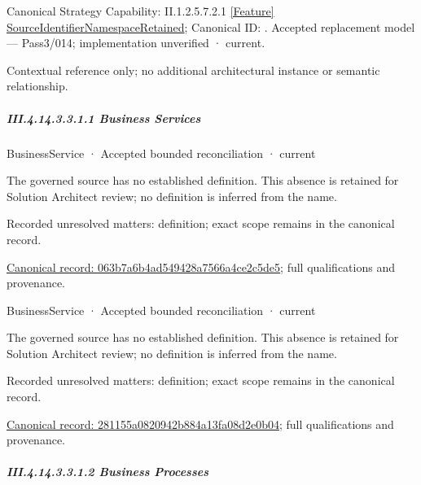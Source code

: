 {\small Canonical Strategy Capability: II.1.2.5.7.2.1 \hyperref[element:6c77e4aa99d6438c93a5df4720758414]{[Feature] SourceIdentifierNamespaceRetained}; Canonical ID: \texttt{}. Accepted replacement model — Pass3/014; implementation unverified · current.}\par
Contextual reference only; no additional architectural instance or semantic relationship.\par
\subparagraph*{III.4.14.3.3.1.1 Business Services}
\label{navigation:III.4.14.3.3.1.1}

\label{navigation:III.4.14.3.3.1.1.1}

\label{element:063b7a6b4ad549428a7566a4ce2c5de5}
{\small BusinessService · Accepted bounded reconciliation · current}\par

The governed source has no established definition. This absence is retained for Solution Architect review; no definition is inferred from the name.


{\small Recorded unresolved matters: definition; exact scope remains in the canonical record.}\par
{\footnotesize \href{../../../../../../../continuum/business/business-service/063b7a6b4ad549428a7566a4ce2c5de5.md}{Canonical record: 063b7a6b4ad549428a7566a4ce2c5de5}; full qualifications and provenance.}\par
{}
\label{navigation:III.4.14.3.3.1.1.2}

\label{element:281155a0820942b884a13fa08d2e0b04}
{\small BusinessService · Accepted bounded reconciliation · current}\par

The governed source has no established definition. This absence is retained for Solution Architect review; no definition is inferred from the name.


{\small Recorded unresolved matters: definition; exact scope remains in the canonical record.}\par
{\footnotesize \href{../../../../../../../continuum/business/business-service/281155a0820942b884a13fa08d2e0b04.md}{Canonical record: 281155a0820942b884a13fa08d2e0b04}; full qualifications and provenance.}\par
\subparagraph*{III.4.14.3.3.1.2 Business Processes}
\label{navigation:III.4.14.3.3.1.2}

